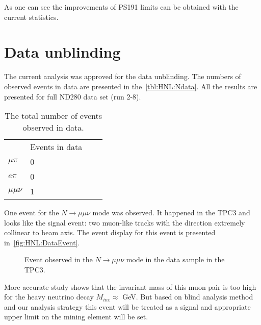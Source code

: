 \documentclass[../main.tex]{subfiles}
\begin{document}
As one can see the improvements of PS191 limits can be obtained with the current statistics.

\section{Data unblinding}
The current analysis was approved for the data unblinding. The numbers of observed events in data are presented in the~\autoref{tbl:HNL:Ndata}. All the results are presented for full ND280 data set (run 2-8).

\begin{table}[!ht]
\begin{center}
\begin{tabular}{llll}
                            & Events in data      \\
  $\mu\pi$ \hspace{0.5cm}   & 0  \hspace{2cm}     \\
  $e\pi$                    & 0                   \\
  $\mu\mu\nu$               & 1                   \\
\end{tabular}
\caption{The total number of events observed in data.}
\label{tbl:HNL:Ndata}
\end{center}
\end{table}

One event for the $N\to\mu\mu\nu$ mode was observed. It happened in the TPC3 and looks like the signal event: two muon-like tracks with the direction extremely collinear to beam axis. The event display for this event is presented in~\autoref{fig:HNL:DataEvent}.

\begin{figure}[!ht]
    \begin{center}
  \begin{minipage}{0.49\linewidth}
  \end{minipage}
  \begin{minipage}{0.49\linewidth}
  \end{minipage}
  \caption{Event observed in the $N\to\mu\mu\nu$ mode in the data sample in the TPC3.}
  \label{fig:HNL:DataEvent}
  \end{center}
\end{figure}

More accurate study shows that the invariant mass of this muon pair is too high for the heavy neutrino decay $M_{inv}\approx$ GeV. But based on blind analysis method and our analysis strategy this event will be treated as a signal and appropriate upper limit on the mining element will be set.
\end{document}
